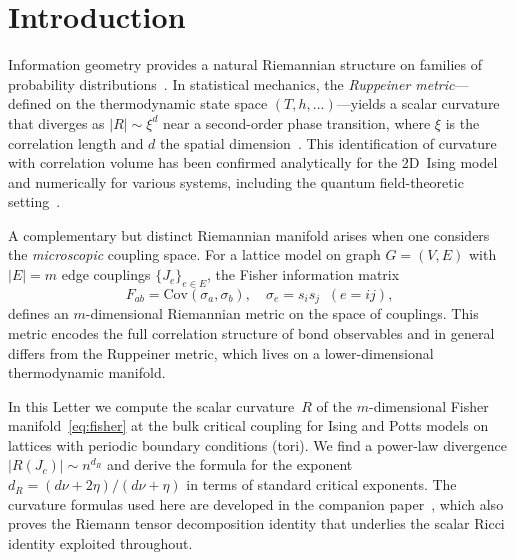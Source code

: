 \documentclass[aps,prl,twocolumn,superscriptaddress,showpacs]{revtex4-2}
\newcommand{\Scal}{R}
\newcommand{\Jc}{J_c}
\newcommand{\dR}{d_{\Scal}}
\begin{document}

\section{Introduction}

Information geometry provides a natural Riemannian structure on
families of probability distributions~\cite{Amari2000,Ruppeiner1995}.
In statistical mechanics, the \emph{Ruppeiner metric}---defined on the
thermodynamic state space $(T, h, \ldots)$---yields a scalar curvature
that diverges as $|\Scal| \sim \xi^d$ near a second-order phase
transition, where $\xi$ is the correlation length and $d$ the spatial
dimension~\cite{Ruppeiner1979,Janke2004}. This identification of
curvature with correlation volume has been confirmed analytically for
the 2D~Ising model~\cite{BrodyRitz2003} and numerically for various
systems, including the quantum field-theoretic
setting~\cite{Erdmenger2020}.

A complementary but distinct Riemannian manifold arises when one
considers the \emph{microscopic} coupling space. For a lattice
model on graph $G = (V, E)$ with $|E| = m$ edge couplings
$\{J_e\}_{e \in E}$, the Fisher information matrix
\begin{equation}
  F_{ab} = \mathrm{Cov}(\sigma_a, \sigma_b),
  \quad \sigma_e = s_i s_j \;\; (e = ij),
  \label{eq:fisher}
\end{equation}
defines an $m$-dimensional Riemannian metric on the space of couplings.
This metric encodes the full correlation structure of bond observables
and in general differs from the Ruppeiner metric, which lives on a
lower-dimensional thermodynamic manifold.

In this Letter we compute the scalar curvature~$\Scal$ of the
$m$-dimensional Fisher manifold~\eqref{eq:fisher} at the bulk critical
coupling for Ising and Potts models on lattices with periodic boundary
conditions (tori). We find a power-law divergence
$|\Scal(\Jc)| \sim n^{\dR}$ and derive the formula for the exponent
$\dR = (d\nu + 2\eta)/(d\nu + \eta)$ in terms of standard critical
exponents. The curvature formulas used here are developed in the
companion paper~\cite{Paper7}, which also proves the Riemann tensor decomposition
identity that underlies the scalar Ricci identity exploited throughout.


\end{document}
